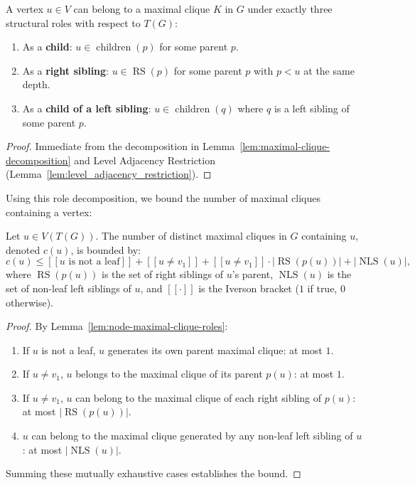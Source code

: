 \begin{lemma}
\label{lem:node-maximal-clique-roles}
A vertex $u \in V$ can belong to a maximal clique $K$ in $G$ under exactly three structural roles with respect to $T(G)$:
\begin{enumerate}
    \item As a \textbf{child}: $u \in \operatorname{children}(p)$ for some parent $p$.
    \item As a \textbf{right sibling}: $u \in \operatorname{RS}(p)$ for some parent $p$ with $p < u$ at the same depth.
    \item As a \textbf{child of a left sibling}: $u \in \operatorname{children}(q)$ where $q$ is a left sibling of some parent $p$.
\end{enumerate}
\end{lemma}
\begin{proof}
Immediate from the decomposition in Lemma~\ref{lem:maximal-clique-decomposition} and Level Adjacency Restriction (Lemma~\ref{lem:level_adjacency_restriction}).
\end{proof}

Using this role decomposition, we bound the number of maximal cliques containing a vertex:

\begin{lemma}
\label{lem:number-maximal-cliques-node}
Let $u \in V(T(G))$. The number of distinct maximal cliques in $G$ containing $u$, denoted $c(u)$, is bounded by:
\begin{equation}
    c(u) \le [\![ u \text{ is not a leaf} ]\!] + [\![ u \ne v_1 ]\!] + [\![ u \ne v_1 ]\!] \cdot |\operatorname{RS}(p(u))| + |\operatorname{NLS}(u)|,
\end{equation}
where $\operatorname{RS}(p(u))$ is the set of right siblings of $u$'s parent, $\operatorname{NLS}(u)$ is the set of non-leaf left siblings of $u$, and $[\![\cdot]\!]$ is the Iverson bracket ($1$ if true, $0$ otherwise).
\end{lemma}
\begin{proof}
By Lemma~\ref{lem:node-maximal-clique-roles}:
\begin{enumerate}
    \item If $u$ is not a leaf, $u$ generates its own parent maximal clique: at most $1$.
    \item If $u \ne v_1$, $u$ belongs to the maximal clique of its parent $p(u)$: at most $1$.
    \item If $u \ne v_1$, $u$ can belong to the maximal clique of each right sibling of $p(u)$: at most $|\operatorname{RS}(p(u))|$.
    \item $u$ can belong to the maximal clique generated by any non-leaf left sibling of $u$: at most $|\operatorname{NLS}(u)|$.
\end{enumerate}
Summing these mutually exhaustive cases establishes the bound.
\end{proof}

